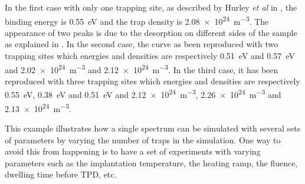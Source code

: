 In the first case with only one trapping site, as described by Hurley \textit{et al} in , the binding energy is \SI{0.55}{eV} and the trap density is \SI{2.08e24}{m^{-3}}.
The appearance of two peaks is due to the desorption on different sides of the sample as explained in .
In the second case, the curve as been reproduced with two trapping sites which energies and densities are respectively \SI{0.51}{eV} and \SI{0.57}{eV} and \SI{2.02e24}{m^{-3}} and \SI{2.12e24}{m^{-3}}.
In the third case, it has been reproduced with three trapping sites which energies and densities are respectively \SI{0.55}{eV}, \SI{0.38}{eV} and \SI{0.51}{eV} and \SI{2.12e24}{m^{-3}}, \SI{2.26e24}{m^{-3}} and \newline \SI{2.13e24}{m^{-3}}.

This example illustrates how a single spectrum can be simulated with several sets of parameters by varying the number of traps in the simulation.
One way to avoid this from happening is to have a set of experiments with varying parameters such as the implantation temperature, the heating ramp, the fluence, dwelling time before TPD, etc.
